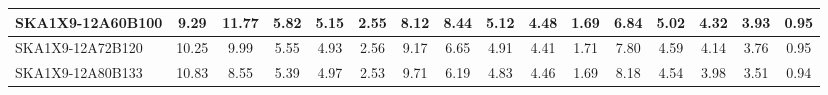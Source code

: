 \begin{table}[H]
{{\begin{tabular}{|lccccc||ccccc||ccccc|}
SKA1X9-12A60B100 & 9.29 \cellcolor{blue!26.66} & 11.77 \cellcolor{red!60.00} & 5.82 \cellcolor{green!46.22} & 5.15 \cellcolor{orange!34.21} & 2.55 \cellcolor{purple!23.60} & 8.12 \cellcolor{blue!28.20} & 8.44 \cellcolor{red!44.60} & 5.12 \cellcolor{green!47.00} & 4.48 \cellcolor{orange!25.00} & 1.69 \cellcolor{purple!18.00} & 6.84 \cellcolor{blue!33.94} & 5.02 \cellcolor{red!40.15} & 4.32 \cellcolor{green!43.96} & 3.93 \cellcolor{orange!43.57} & 0.95 \cellcolor{purple!25.00}\\ \hline 
SKA1X9-12A72B120 & 10.25 \cellcolor{blue!47.44} & 9.99 \cellcolor{red!43.42} & 5.55 \cellcolor{green!28.50} & 4.93 \cellcolor{orange!18.00} & 2.56 \cellcolor{purple!26.40} & 9.17 \cellcolor{blue!49.20} & 6.65 \cellcolor{red!24.76} & 4.91 \cellcolor{green!26.00} & 4.41 \cellcolor{orange!18.00} & 1.71 \cellcolor{purple!26.40} & 7.80 \cellcolor{blue!52.61} & 4.59 \cellcolor{red!20.31} & 4.14 \cellcolor{green!30.22} & 3.76 \cellcolor{orange!33.22} & 0.95 \cellcolor{purple!25.00}\\ \hline 
SKA1X9-12A80B133 & 10.83 \cellcolor{blue!60.00} & 8.55 \cellcolor{red!30.01} & 5.39 \cellcolor{green!18.00} & 4.97 \cellcolor{orange!20.95} & 2.53 \cellcolor{purple!18.00} & 9.71 \cellcolor{blue!60.00} & 6.19 \cellcolor{red!19.66} & 4.83 \cellcolor{green!18.00} & 4.46 \cellcolor{orange!23.00} & 1.69 \cellcolor{purple!18.00} & 8.18 \cellcolor{blue!60.00} & 4.54 \cellcolor{red!18.00} & 3.98 \cellcolor{green!18.00} & 3.51 \cellcolor{orange!18.00} & 0.94 \cellcolor{purple!18.00}\\ \hline 
\end{tabular}}
\vspace{-0.300000cm}
\hspace{1cm} 
}
\end{table}
